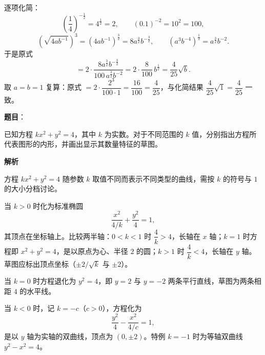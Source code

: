\begin{answer}
逐项化简：
\nopagebreak[4]
\[
\left(\frac14\right)^{-\frac12}=4^{\frac12}=2,\qquad (0.1)^{-2}=10^2=100,
\]
\nopagebreak[4]
\[
\left(\sqrt{4ab^{-1}}\right)^3=\left(4ab^{-1}\right)^{\frac32}=8a^{\frac32}b^{-\frac32},\qquad
\left(a^3b^{-4}\right)^{\frac12}=a^{\frac32}b^{-2}.
\]
于是原式
\nopagebreak[4]
\[
=2\cdot\frac{8a^{\frac32}b^{-\frac32}}{100\,a^{\frac32}b^{-2}}
=2\cdot\frac{8}{100}\,b^{\frac12}=\frac{4}{25}\sqrt b.
\]
取 $a=b=1$ 复算：原式 $=2\cdot\dfrac{2^3}{100\cdot1}=\dfrac{16}{100}=\dfrac{4}{25}$，与化简结果 $\dfrac{4}{25}\sqrt1=\dfrac{4}{25}$ 一致。



\gkanswer{答案（3）：$x\ge-1$（即 $[-1,+\infty)$）}



\end{answer}
\begin{answer}

\textbf{题目}：

已知方程 $kx^2+y^2=4$，其中 $k$ 为实数。对于不同范围的 $k$ 值，分别指出方程所代表图形的内形，并画出显示其数量特征的草图。

\textbf{解析}

方程 $kx^2+y^2=4$ 随参数 $k$ 取值不同而表示不同类型的曲线，需按 $k$ 的符号与 $1$ 的大小分档讨论。

当 $k>0$ 时化为标准椭圆
\nopagebreak[4]
\[
\frac{x^2}{4/k}+\frac{y^2}{4}=1,
\]
其顶点在坐标轴上。比较两半轴：$0<k<1$ 时 $\dfrac4k>4$，长轴在 $x$ 轴；$k=1$ 时方程即 $x^2+y^2=4$，是以原点为心、半径 $2$ 的圆；$k>1$ 时 $\dfrac4k<4$，长轴在 $y$ 轴。草图应标出顶点坐标（$\pm2/\sqrt k$ 与 $\pm2$）。

当 $k=0$ 时方程退化为 $y^2=4$，即 $y=2$ 与 $y=-2$ 两条平行直线，草图为两条相距 $4$ 的水平线。

当 $k<0$ 时，记 $k=-c$（$c>0$），方程化为
\nopagebreak[4]
\[
\frac{y^2}{4}-\frac{x^2}{4/c}=1,
\]
是以 $y$ 轴为实轴的双曲线，顶点为 $(0,\pm2)$。特例 $k=-1$ 时为等轴双曲线 $y^2-x^2=4$。


\end{answer}
